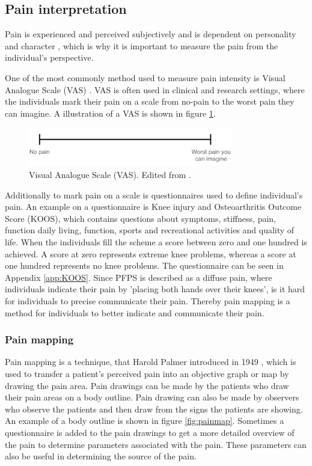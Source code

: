 \subsection{Pain interpretation}
Pain is experienced and perceived subjectively \citep{IASP2012, Younger2009} and is dependent on personality and character \citep{Schmidt2013}, which is why it is important to measure the pain from the individual’s perspective.
 
\noindent
One of the most commonly method used to measure pain intensity is Visual Analogue Scale (VAS) \citep{Valente2011}. VAS is often used in clinical and research settings, where the individuals mark their pain on a scale from no-pain to the worst pain they can imagine.\citep{Haefeli2005} A illustration of a VAS is shown in figure \ref{fig:VAS}.

\begin{figure} [H]
\centering
\includegraphics[width=0.8\textwidth]{figures/VAS}
\caption{Visual Analogue Scale (VAS). Edited from \citep{Haefeli2005}.}
\label{fig:VAS}
\end{figure}

\noindent
Additionally to mark pain on a scale is questionnaires used to define individual's pain. An example on a questionnaire is Knee injury and Osteoarthritis Outcome Score (KOOS), which contains questions about symptoms, stiffness, pain, function daily living, function, sports and recreational activities and quality of life. When the individuals fill the scheme a score between zero and one hundred is achieved. A score at zero represents extreme knee problems, whereas a score at one hundred represents no knee problems.\citep{Roos2003} The questionnaire can be seen in Appendix \ref{app:KOOS}. 
\noindent 
Since PFPS is described as a diffuse pain, where individuals indicate their pain by 'placing both hands over their knees', is it hard for individuals to precise communicate their pain. Thereby pain mapping is a method for individuals to better indicate and communicate their pain. 

\subsubsection{Pain mapping}
Pain mapping is a technique, that Harold Palmer introduced in 1949 \citep{Grunnesjo2006}, which is used to transfer a patient’s perceived pain into an objective graph or map by drawing the pain area. Pain drawings can be made by the patients who draw their pain areas on a body outline. Pain drawing can also be made by observers who observe the patients and then draw from the signs the patients are showing. An example of a body outline is shown in figure \ref{fig:painmap}. Sometimes a questionnaire is added to the pain drawings to get a more detailed overview of the pain to determine parameters associated with the pain. These parameters can also be useful in determining the source of the pain.\citep{Schott2010}


